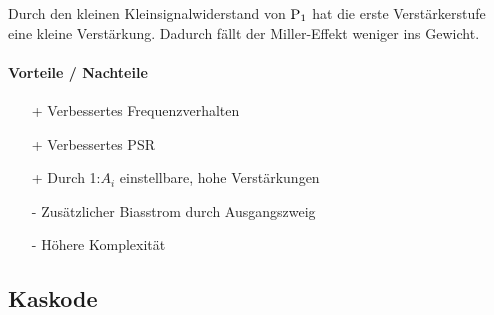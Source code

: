 \begin{minipage}[t]{0.66\columnwidth}
    Durch den kleinen Kleinsignalwiderstand von $\rm P_1$ hat die erste Verstärkerstufe eine kleine Verstärkung. 
    Dadurch fällt der Miller-Effekt weniger ins Gewicht.

    \paragraph{Vorteile / Nachteile}
    \raggedright

     \begin{itemize}
        \item[+] Verbessertes Frequenzverhalten
        \item[+] Verbessertes PSR
        \item[+] Durch 1:$A_i$ einstellbare, hohe Verstärkungen
        \item[-] Zusätzlicher Biasstrom durch Ausgangszweig
        \item[-] Höhere Komplexität 
     \end{itemize}

\end{minipage}


\subsection{Kaskode}

